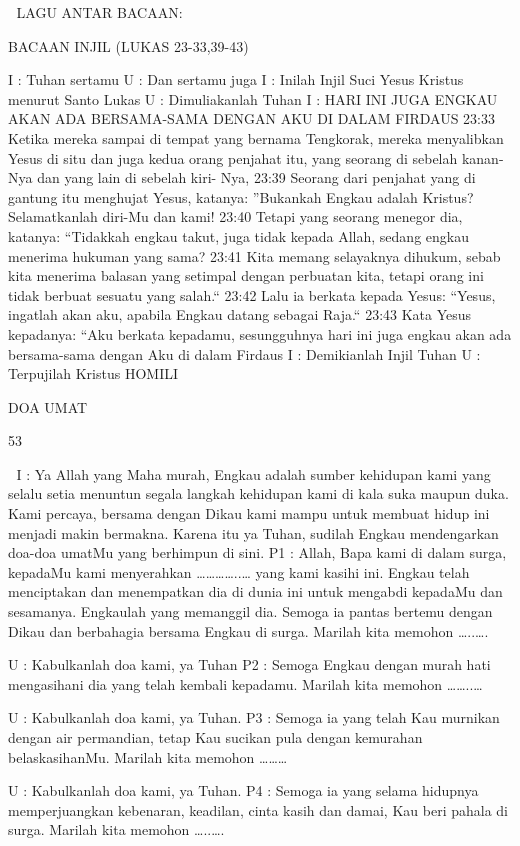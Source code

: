 \documentclass[10pt,a5paper,fancyhdr]{memoir}
\begin{document}

LAGU ANTAR BACAAN: 

BACAAN INJIL (LUKAS 23-33,39-43) 

I : Tuhan sertamu 
U : Dan sertamu juga 
I : Inilah Injil Suci Yesus Kristus menurut Santo Lukas 
U : Dimuliakanlah Tuhan 
I : HARI INI JUGA ENGKAU AKAN ADA BERSAMA-SAMA 
DENGAN AKU DI DALAM FIRDAUS 
23:33 Ketika mereka sampai di tempat yang bernama Tengkorak, 
mereka menyalibkan Yesus di situ dan juga kedua orang penjahat itu, 
yang seorang di sebelah kanan-Nya dan yang lain di sebelah kiri-
Nya, 23:39 Seorang dari penjahat yang di gantung itu menghujat 
Yesus, katanya: ”Bukankah Engkau adalah Kristus? Selamatkanlah 
diri-Mu dan kami! 23:40 Tetapi yang seorang menegor dia, katanya: 
“Tidakkah engkau takut, juga tidak kepada Allah, sedang engkau 
menerima hukuman yang sama? 23:41 Kita memang selayaknya 
dihukum, sebab kita menerima balasan yang setimpal dengan 
perbuatan kita, tetapi orang ini tidak berbuat sesuatu yang salah.“ 
23:42 Lalu ia berkata kepada Yesus: “Yesus, ingatlah akan aku, 
apabila Engkau datang sebagai Raja.“ 23:43 Kata Yesus kepadanya: 
“Aku berkata kepadamu, sesungguhnya hari ini juga engkau akan ada 
bersama-sama dengan Aku di dalam Firdaus 
I : Demikianlah Injil Tuhan 
U : Terpujilah Kristus 
HOMILI 

DOA UMAT 

53 



I : Ya Allah yang Maha murah, Engkau adalah sumber kehidupan 
kami yang selalu setia menuntun segala langkah kehidupan kami di 
kala suka maupun duka. Kami percaya, bersama dengan Dikau kami 
mampu untuk membuat hidup ini menjadi makin bermakna. Karena 
itu ya Tuhan, sudilah Engkau mendengarkan doa-doa umatMu yang 
berhimpun di sini. 
P1 : Allah, Bapa kami di dalam surga, kepadaMu kami menyerahkan 
…………..… yang kami kasihi ini. Engkau telah menciptakan dan 
menempatkan dia di dunia ini untuk mengabdi kepadaMu dan 
sesamanya. Engkaulah yang memanggil dia. Semoga ia pantas 
bertemu dengan Dikau dan berbahagia bersama Engkau di surga. 
Marilah kita memohon …..…. 

U : Kabulkanlah doa kami, ya Tuhan 
P2 : Semoga Engkau dengan murah hati mengasihani dia yang telah 
kembali kepadamu. Marilah kita memohon ……..… 

U : Kabulkanlah doa kami, ya Tuhan. 
P3 : Semoga ia yang telah Kau murnikan dengan air permandian, 
tetap Kau sucikan pula dengan kemurahan belaskasihanMu. Marilah 
kita memohon ……… 

U : Kabulkanlah doa kami, ya Tuhan. 
P4 : Semoga ia yang selama hidupnya memperjuangkan kebenaran, 
keadilan, cinta kasih dan damai, Kau beri pahala di surga. Marilah 
kita memohon …..…. 
\end{document}
